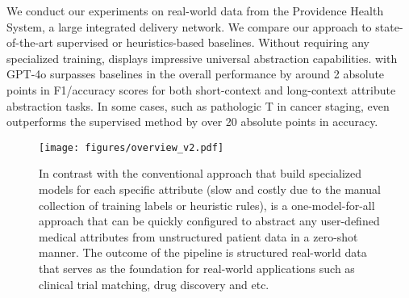 We conduct our experiments on real-world data from the Providence Health System, a large integrated delivery network. We compare our approach to state-of-the-art supervised or heuristics-based baselines. 
Without requiring any specialized training, \ours displays impressive universal abstraction capabilities. \ours with GPT-4o surpasses baselines in the overall performance by around 2 absolute points in F1/accuracy scores for both short-context and long-context attribute abstraction tasks.
In some cases, such as pathologic T in cancer staging, \ours even outperforms the supervised method by over 20 absolute points in accuracy. 











\begin{figure}[t!]
\centering
\texttt{[image: figures/overview\_v2.pdf]}
\caption{In contrast with the conventional approach that build specialized models for each specific attribute (slow and costly due to the manual collection of training labels or heuristic rules), \ours is a one-model-for-all approach that can be quickly configured to abstract any user-defined medical attributes from unstructured patient data in a zero-shot manner. The outcome of the pipeline is structured real-world data that serves as the foundation for real-world applications such as clinical trial matching, drug discovery and etc.}
\label{fig:gpt-overview}
\end{figure}
